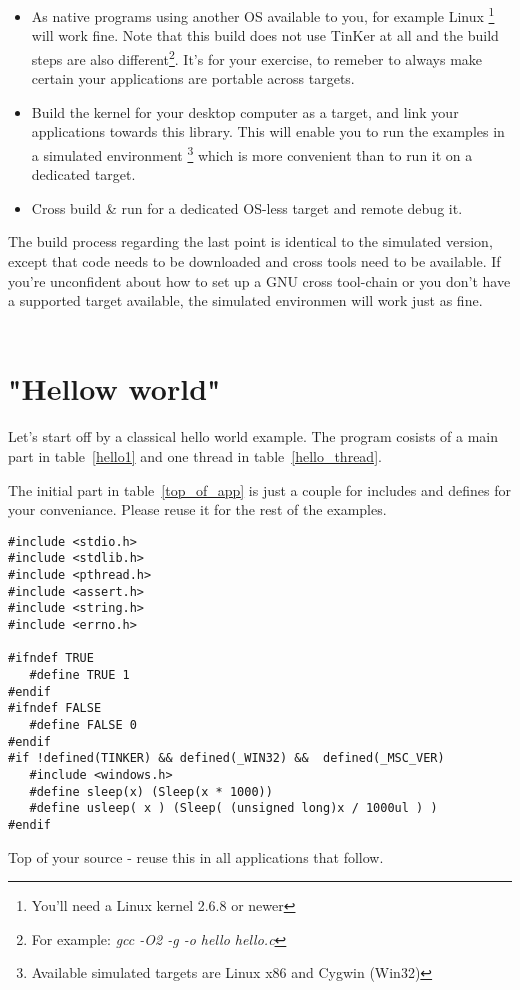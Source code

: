 \begin{itemize}
\item As native programs using another OS available to you, for example Linux \footnote{You'll need a Linux kernel 2.6.8 or newer} will work fine. Note that this build does not use TinKer at all and the build steps are also different\footnote{For example: \textit{gcc -O2 -g -o hello hello.c}}. It's for your exercise, to remeber to always make certain your applications are portable across targets.
\item Build the kernel for your desktop computer as a target, and link your applications towards this library. This will enable you to run the examples in a simulated environment \footnote{Available simulated targets are Linux x86 and Cygwin (Win32)} which is more convenient than to run it on a dedicated target.
\item Cross build \& run for a dedicated OS-less target and remote debug it. 
\end{itemize}
%
The build process regarding the last point is identical to the simulated version, except that code needs to be downloaded and cross tools need to be available. If you're unconfident about how to set up a GNU cross tool-chain or you don't have a supported target available, the simulated environmen will work just as fine.
\\\\

\chapter{"Hellow world"}
Let's start off by a classical hello world example. The program cosists of a main part in table~\ref{hello1} and one thread in table~\ref{hello_thread}.

The initial part in table~\ref{top_of_app} is just a couple for includes and defines for your conveniance. Please reuse it for the rest of the examples.

\begin{table}[!hbp]
\begin{verbatim}
#include <stdio.h>
#include <stdlib.h>
#include <pthread.h>
#include <assert.h>
#include <string.h>
#include <errno.h>

#ifndef TRUE
   #define TRUE 1
#endif
#ifndef FALSE
   #define FALSE 0
#endif
#if !defined(TINKER) && defined(_WIN32) &&  defined(_MSC_VER)
   #include <windows.h>
   #define sleep(x) (Sleep(x * 1000))
   #define usleep( x ) (Sleep( (unsigned long)x / 1000ul ) )
#endif
\end{verbatim}
\caption{Top of your source - reuse this in all applications that follow.\label{top_of_app}}
\end{table}

